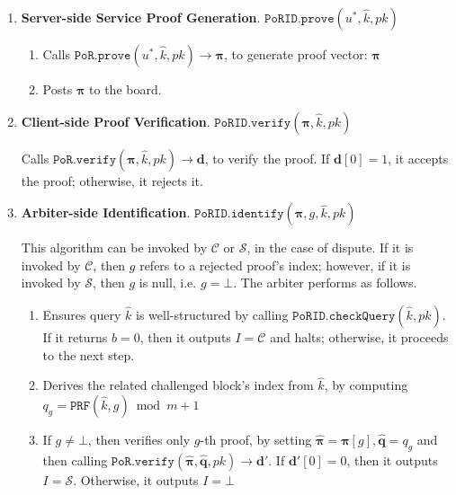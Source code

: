 \begin{enumerate}
\item\textbf{Server-side Service Proof Generation}. $\mathtt{PoRID.prove}(u^{\scriptscriptstyle *},\hat{k},pk)$ 
\begin{enumerate}
\item Calls $\mathtt{PoR.prove}(u^{\scriptscriptstyle *},\hat{k},pk)\rightarrow  {\bm{\pi}}$, to generate proof vector: $ {\bm{\pi}}$ 
\item Posts $ {\bm{\pi}}$ to the board. 
\end{enumerate}

\item\textbf{Client-side Proof Verification}\label{PoRID::Client-side-Proof-Verification}. $\mathtt{PoRID.verify}( {\bm{\pi}},\hat{k} ,pk)$

 Calls $\mathtt{PoR.verify}( {\bm{\pi}},\hat{k} ,pk)\rightarrow  {\bm{d}}$, to verify the proof. If $ {\bm{d}}[0] = 1$,  it accepts the proof; otherwise, it rejects it.

\item\textbf{Arbiter-side Identification}\label{PoRID::Arbiter-side-Identification}. $\mathtt{PoRID.identify}( {\bm{\pi}}, g,\hat{k},pk)$ 

This algorithm can be invoked by $\mathcal{C}$ or $\mathcal{S}$, in the case of dispute. If it is invoked by $\mathcal{C}$, then $g$ refers to a rejected proof's  index; however, if it is invoked by $\mathcal{S}$, then $g$ is null, i.e.  $g=\bot$. The arbiter performs as follows. 


\begin{enumerate}


\item Ensures  query $\hat{k}$ is well-structured by calling $\mathtt{PoRID.checkQuery}(\hat{k}, pk)$. If it returns $b=0$, then it outputs $I=\mathcal C$ and halts; otherwise, it proceeds to the next step. 



\item Derives the related challenged block's index from $\hat{k}$, by computing $q_{\scriptscriptstyle g}=\mathtt{PRF}(\hat{k},g)\bmod m+1$ 



\item If $g\neq \bot$, then verifies only $g$-th proof, by setting $\hat{\bm{\pi}}={\bm{\pi}}[g], \hat{\bm{q}}=q_{\scriptscriptstyle g}$ and then calling $\mathtt{PoR.verify}( \hat{\bm{\pi}},\hat{\bm{q}},pk)\rightarrow  {\bm{d}}'$. If $ {\bm{d}}'[0]=0$, then it outputs $I=\mathcal S$. Otherwise, it outputs $I=\bot$
\end{enumerate}
\end{enumerate}

